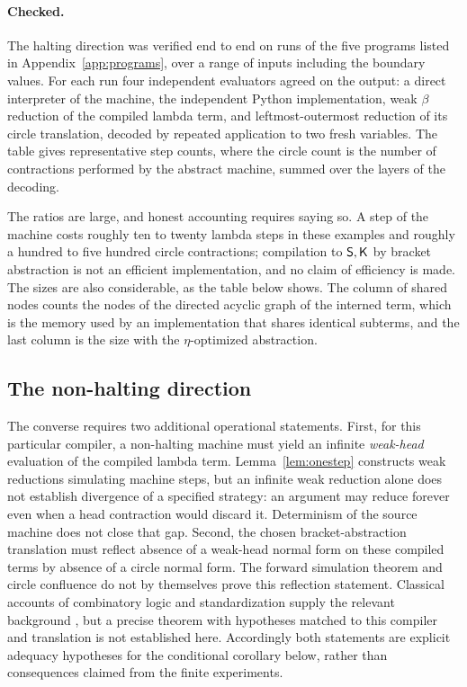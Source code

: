 \paragraph{Checked.} The halting direction was verified end to end on \factMachineRuns{} runs of the five programs listed in Appendix~\ref{app:programs}, over a range of inputs including the boundary values. For each run four independent evaluators agreed on the output: a direct interpreter of the machine, the independent Python implementation, weak $\beta$ reduction of the compiled lambda term, and leftmost-outermost reduction of its circle translation, decoded by repeated application to two fresh variables. The table gives representative step counts, where the circle count is the number of contractions performed by the abstract machine, summed over the layers of the decoding.

\begin{center}
\tableMachines
\end{center}

The ratios are large, and honest accounting requires saying so. A step of the machine costs roughly ten to twenty lambda steps in these examples and roughly a hundred to five hundred circle contractions; compilation to $\mathsf{S},\mathsf{K}$ by bracket abstraction is not an efficient implementation, and no claim of efficiency is made. The sizes are also considerable, as the table below shows. The column of shared nodes counts the nodes of the directed acyclic graph of the interned term, which is the memory used by an implementation that shares identical subterms, and the last column is the size with the $\eta$-optimized abstraction.

\begin{center}
\tableSizes
\end{center}

\subsection{The non-halting direction}

The converse requires two additional operational statements. First, for this particular compiler, a non-halting machine must yield an infinite \emph{weak-head} evaluation of the compiled lambda term. Lemma~\ref{lem:onestep} constructs weak reductions simulating machine steps, but an infinite weak reduction alone does not establish divergence of a specified strategy: an argument may reduce forever even when a head contraction would discard it. Determinism of the source machine does not close that gap. Second, the chosen bracket-abstraction translation must reflect absence of a weak-head normal form on these compiled terms by absence of a circle normal form. The forward simulation theorem and circle confluence do not by themselves prove this reflection statement. Classical accounts of combinatory logic and standardization supply the relevant background \cite{curry-feys,hindley-seldin}, but a precise theorem with hypotheses matched to this compiler and translation is not established here. Accordingly both statements are explicit adequacy hypotheses for the conditional corollary below, rather than consequences claimed from the finite experiments.


